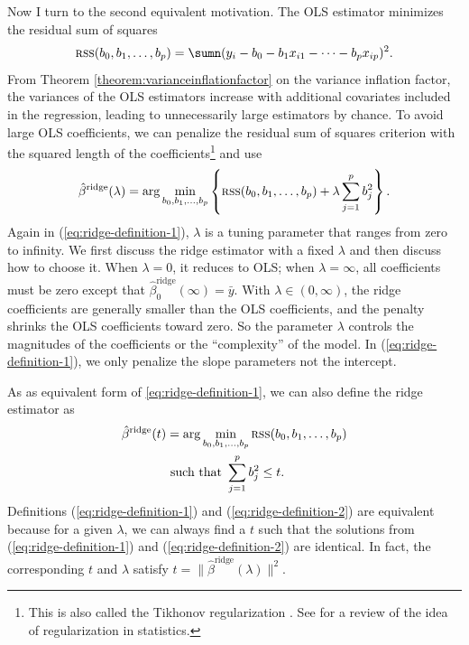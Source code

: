 Now I turn to the second equivalent motivation. The 
OLS estimator minimizes the residual sum of squares 
$$
\textsc{rss}(b_0,b_1,\ldots,b_p) = 
\sumn(y_{i}-b_{0}-b_{1}x_{i1}-\cdots-b_{p}x_{ip})^{2}.
$$
From Theorem \ref{theorem:varianceinflationfactor} on the variance inflation factor, the variances of the OLS
estimators increase with additional covariates included in the regression,
leading to unnecessarily large estimators by chance. To avoid large OLS coefficients,
we can penalize the residual sum of squares criterion with the squared length of the coefficients\footnote{This is also called the Tikhonov regularization \citep{tikhonov1943stability}. See \citet{bickel2006regularization} for a review of the idea of regularization in statistics.}  
and use
\begin{equation}
\hat{\beta}^{\text{ridge}}(\lambda)=\arg\min_{b_{0},b_{1},\ldots,b_{p}}\left\{ \textsc{rss}(b_0,b_1,\ldots,b_p)+\lambda\sum_{j=1}^{p}b_{j}^{2}\right\} .\label{eq:ridge-definition-1}
\end{equation}
Again in (\ref{eq:ridge-definition-1}), $\lambda $ is a tuning parameter
that ranges from zero to infinity. We first discuss the ridge estimator
with a fixed $\lambda$ and then discuss how to choose it. When $\lambda=0$,
it reduces to OLS; when $\lambda=\infty$, all coefficients must be
zero except that $\hat{\beta}_{0}^{\text{ridge}}(\infty)=\bar{y}$.
With $\lambda \in (0,\infty)$, the ridge coefficients are generally
smaller than the OLS coefficients, and the penalty shrinks the OLS
coefficients toward zero. So the parameter $\lambda$ controls the
magnitudes of the coefficients or the ``complexity'' of the model.
In (\ref{eq:ridge-definition-1}), we only penalize the slope parameters
not the intercept. 


As as equivalent form of \eqref{eq:ridge-definition-1}, we can also
define the ridge estimator as
\begin{align}
\hat{\beta}^{\text{ridge}}(t) & =\arg\min_{b_{0},b_{1},\ldots,b_{p}} \textsc{rss}(b_0,b_1,\ldots,b_p) \nonumber \\
 & \ \textup{such that }\sum_{j=1}^{p}b_{j}^{2}\leq t.\label{eq:ridge-definition-2}
\end{align}
Definitions (\ref{eq:ridge-definition-1}) and (\ref{eq:ridge-definition-2})
are equivalent because for a given $\lambda$, we can always find
a $t$ such that the solutions from (\ref{eq:ridge-definition-1})
and (\ref{eq:ridge-definition-2}) are identical. In fact, the corresponding $t$ and $\lambda$ satisfy $t = \|  \hat{\beta}^{\text{ridge}} (\lambda)  \|^2 .$

